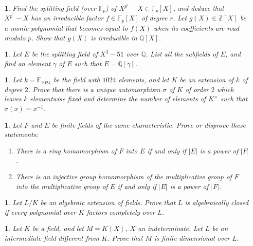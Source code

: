 \documentclass[a4paper,11pt,final,openany]{memoir}
\newtheorem{exercise}[Y]{}
\theoremstyle{nonumberplain}
\begin{document}
\begin{exercise}
\label{x72} Find the splitting field (over $\mathbb{F}_{p}$) of $X^{p^{r}%
}-X\in\mathbb{F}_{p}[X]$, and deduce that $X^{p^{r}}-X$ has an irreducible
factor $f\in\mathbb{F}_{p}[X]$ of degree $r$. Let $g(X)\in\mathbb{Z}[X]$ be a
monic polynomial that becomes equal to $f(X)$ when its coefficients are read
modulo $p$. Show that $g(X)$ is irreducible in ${\mathbb{Q}}[X]$.
\end{exercise}

\begin{exercise}
\label{x73} Let $E$ be the splitting field of $X^{3}-51$ over ${\mathbb{Q}}$.
List all the subfields of $E$, and find an element $\gamma$ of $E$ such that
$E={\mathbb{Q}}[\gamma]$.
\end{exercise}

\begin{exercise}
\label{x74} Let $k=\mathbb{F}_{1024}$ be the field with $1024$ elements, and
let $K$ be an extension of $k$ of degree $2$. Prove that there is a unique
automorphism $\sigma$ of $K$ of order $2$ which leaves $k$ elementwise fixed
and determine the number of elements of $K^{\times}$ such that $\sigma
(x)=x^{-1}$.
\end{exercise}

\begin{exercise}
\label{x75} Let $F$ and $E$ be finite fields of the same characteristic. Prove
or disprove these statements:

\begin{enumerate}
\item There is a ring homomorphism of $F$ into $E$ if and only if $\left\vert
E\right\vert $ is a power of $\left\vert F\right\vert $.

\item There is an injective group homomorphism of the multiplicative group of
$F$ into the multiplicative group of $E$ if and only if $\left\vert
E\right\vert $ is a power of $\left\vert F\right\vert $.
\end{enumerate}
\end{exercise}

\begin{exercise}
\label{x76} Let $L/K$ be an algebraic extension of fields. Prove that $L$ is
algebraically closed if every polynomial over $K$ factors completely over $L$.
\end{exercise}

\begin{exercise}
\label{x77} Let $K$ be a field, and let $M=K(X)$, $X$ an indeterminate. Let
$L$ be an intermediate field different from $K$. Prove that $M$ is
finite-dimensional over $L$.
\end{exercise}
\end{document}
